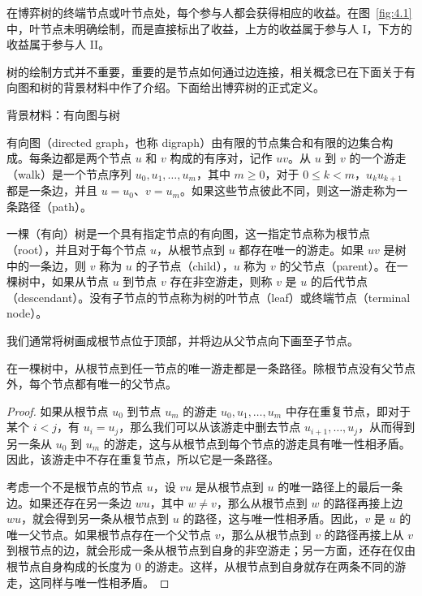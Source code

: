 在博弈树的终端节点或叶节点处，每个参与人都会获得相应的收益。在图~\ref{fig:4.1}中，叶节点未明确绘制，而是直接标出了收益，上方的收益属于参与人 I，下方的收益属于参与人 II。

树的绘制方式并不重要，重要的是节点如何通过边连接，相关概念已在下面关于有向图和树的背景材料中作了介绍。下面给出博弈树的正式定义。

\begin{mybox}{背景材料：有向图与树}
\setlength{\parindent}{2em}

有向图（directed graph，也称 digraph）由有限的节点集合和有限的边集合构成。每条边都是两个节点 \(u\) 和 \(v\) 构成的有序对，记作 \(uv\)。从 \(u\) 到 \(v\) 的一个游走（walk）是一个节点序列 \(u_0,u_1,\ldots,u_m\)，其中 \(m\geq 0\)，对于 \(0\leq k<m\)，\(u_ku_{k+1}\) 都是一条边，并且 \(u=u_0\)、\(v=u_m\)。如果这些节点彼此不同，则这一游走称为一条路径（path）。

一棵（有向）树是一个具有指定节点的有向图，这一指定节点称为根节点（root），并且对于每个节点 \(u\)，从根节点到 \(u\) 都存在唯一的游走。如果 \(uv\) 是树中的一条边，则 \(v\) 称为 \(u\) 的子节点（child），\(u\) 称为 \(v\) 的父节点（parent）。在一棵树中，如果从节点 \(u\) 到节点 \(v\) 存在非空游走，则称 \(v\) 是 \(u\) 的后代节点（descendant）。没有子节点的节点称为树的叶节点（leaf）或终端节点（terminal node）。

我们通常将树画成根节点位于顶部，并将边从父节点向下画至子节点。

\begin{lemma}\label{lem:4.1}
在一棵树中，从根节点到任一节点的唯一游走都是一条路径。除根节点没有父节点外，每个节点都有唯一的父节点。
\end{lemma} 
\begin{proof}
如果从根节点 \(u_0\) 到节点 \(u_m\) 的游走 \(u_0,u_1,\ldots,u_m\) 中存在重复节点，即对于某个 \(i<j\)，有 \(u_i=u_j\)，那么我们可以从该游走中删去节点 \(u_{i+1},\ldots,u_j\)，从而得到另一条从 \(u_0\) 到 \(u_m\) 的游走，这与从根节点到每个节点的游走具有唯一性相矛盾。因此，该游走中不存在重复节点，所以它是一条路径。

考虑一个不是根节点的节点 \(u\)，设 \(vu\) 是从根节点到 \(u\) 的唯一路径上的最后一条边。如果还存在另一条边 \(wu\)，其中 \(w\neq v\)，那么从根节点到 \(w\) 的路径再接上边 \(wu\)，就会得到另一条从根节点到 \(u\) 的路径，这与唯一性相矛盾。因此，\(v\) 是 \(u\) 的唯一父节点。如果根节点存在一个父节点 \(v\)，那么从根节点到 \(v\) 的路径再接上从 \(v\) 到根节点的边，就会形成一条从根节点到自身的非空游走；另一方面，还存在仅由根节点自身构成的长度为 \(0\) 的游走。这样，从根节点到自身就存在两条不同的游走，这同样与唯一性相矛盾。    
\end{proof} 
\end{mybox}


